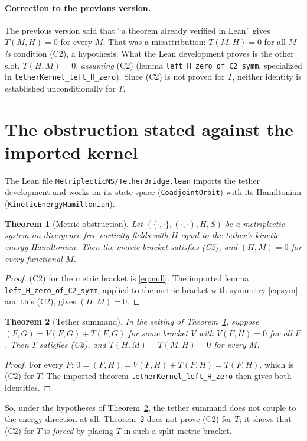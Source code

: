 \documentclass[11pt,a4paper]{article}
\newtheorem{theorem}{Theorem}[section]
\begin{document}
\paragraph{Correction to the previous version.} The previous version said that ``a theorem already
verified in Lean'' gives \(T(M,H)=0\) for every \(M\). That was a misattribution: \(T(M,H)=0\) for all
\(M\) \emph{is} condition (C2), a hypothesis. What the Lean development proves is the other slot,
\(T(H,M)=0\), \emph{assuming} (C2) (lemma \texttt{left\_H\_zero\_of\_C2\_symm}, specialized in
\texttt{tetherKernel\_left\_H\_zero}). Since (C2) is not proved for \(T\), neither identity is
established unconditionally for \(T\).

\section{The obstruction stated against the imported kernel}\label{sec:bridge}
The Lean file \texttt{MetriplecticNS/TetherBridge.lean} imports the tether development and works
on its state space (\texttt{CoadjointOrbit}) with its Hamiltonian (\texttt{KineticEnergyHamiltonian}).

\begin{theorem}[Metric obstruction]\label{thm:bridge}
Let \((\{\cdot,\cdot\},(\cdot,\cdot),H,S)\) be a metriplectic system on divergence-free vorticity fields with
\(H\) equal to the tether's kinetic-energy Hamiltonian. Then the metric bracket satisfies (C2), and
\((H,M)=0\) for every functional \(M\).
\end{theorem}
\begin{proof}
(C2) for the metric bracket is \eqref{eq:null}. The imported lemma
\texttt{left\_H\_zero\_of\_C2\_symm}, applied to the metric bracket with symmetry \eqref{eq:sym} and this
(C2), gives \((H,M)=0\).
\end{proof}

\begin{theorem}[Tether summand]\label{thm:summand}
In the setting of Theorem~\ref{thm:bridge}, suppose \((F,G) = V(F,G) + T(F,G)\) for some bracket \(V\) with
\(V(F,H)=0\) for all \(F\). Then \(T\) satisfies (C2), and \(T(H,M)=T(M,H)=0\) for every \(M\).
\end{theorem}
\begin{proof}
For every \(F\): \(0=(F,H)=V(F,H)+T(F,H)=T(F,H)\), which is (C2) for \(T\). The imported theorem
\texttt{tetherKernel\_left\_H\_zero} then gives both identities.
\end{proof}
So, under the hypotheses of Theorem~\ref{thm:summand}, the tether summand does not couple to the energy
direction at all. Theorem~\ref{thm:summand} does not prove (C2) for \(T\); it shows that (C2) for \(T\) is
\emph{forced} by placing \(T\) in such a split metric bracket.
\end{document}
